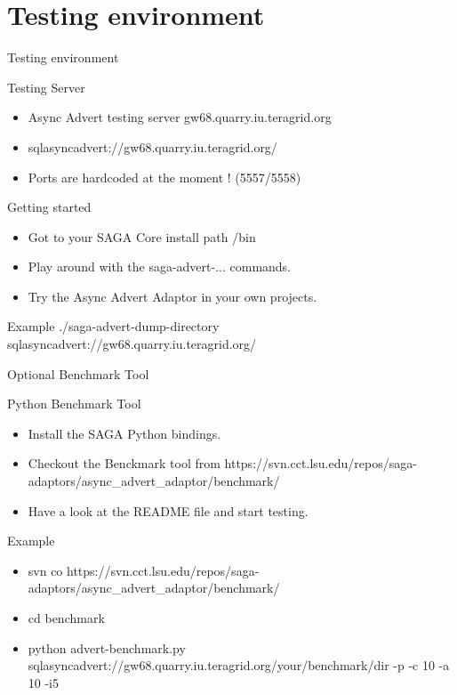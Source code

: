 \documentclass{beamer}
\begin{document}
  \section{Testing environment}
    \begin{frame}{Testing environment}
      \begin{block}{Testing Server}
        \begin{itemize}
          \item Async Advert testing server gw68.quarry.iu.teragrid.org
          \item sqlasyncadvert://gw68.quarry.iu.teragrid.org/
          \item Ports are hardcoded at the moment ! (5557/5558)
          \end{itemize}
      \end{block}
      
      \begin{block}{Getting started}
        \begin{itemize}
          \item Got to your SAGA Core install path /bin
          \item Play around with the saga-advert-... commands.
          \item Try the Async Advert Adaptor in your own projects.
          \end{itemize}
      \end{block}
    
      \begin{exampleblock}{Example}
        ./saga-advert-dump-directory sqlasyncadvert://gw68.quarry.iu.teragrid.org/
      \end{exampleblock}
    \end{frame}
    
    \begin{frame}{Optional Benchmark Tool}
      \begin{block}{Python Benchmark Tool}
        \begin{itemize}
          \item Install the SAGA Python bindings.
          \item Checkout the Benckmark tool from https://svn.cct.lsu.edu/repos/saga-adaptors/async\_advert\_adaptor/benchmark/
          \item Have a look at the README file and start testing.
          \end{itemize}
      \end{block}
      
      \begin{exampleblock}{Example}
        \begin{itemize}
          \item svn co https://svn.cct.lsu.edu/repos/saga-adaptors/async\_advert\_adaptor/benchmark/
          \item cd benchmark
          \item python advert-benchmark.py sqlasyncadvert://gw68.quarry.iu.teragrid.org/your/benchmark/dir -p -c 10 -a 10 -i5
          \end{itemize}
      \end{exampleblock}
    
    \end{frame}
    
\end{document}
